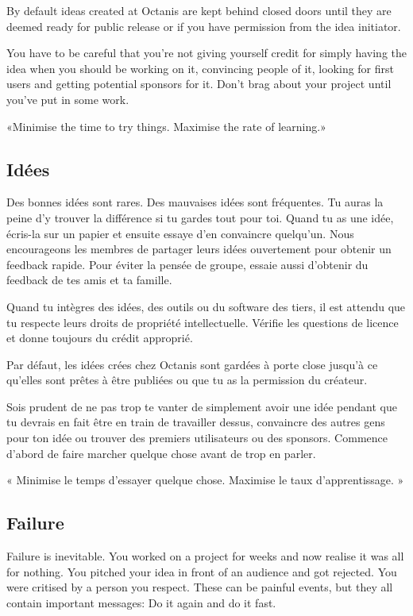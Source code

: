 	By default ideas created at Octanis are kept behind closed doors until they are deemed ready for public release or if you have permission from the idea initiator.

	You have to be careful that you're not giving yourself credit for simply having the idea when you should be working on it, convincing people of it, looking for first users and getting potential sponsors for it. Don't brag about your project until you've put in some work.

	«Minimise the time to try things. Maximise the rate of learning.»





\french
	\subsection{Idées}
	Des bonnes idées sont rares. Des mauvaises idées sont fréquentes. Tu auras la peine d'y trouver la différence si tu gardes tout pour toi. 
	Quand tu as une idée, écris-la sur un papier et ensuite essaye d'en convaincre quelqu'un. Nous encourageons les membres de partager leurs idées ouvertement pour obtenir un feedback rapide. Pour éviter la pensée de groupe, essaie aussi d'obtenir du feedback de tes amis et ta famille. 

	Quand tu intègres des idées, des outils ou du software des tiers, il est attendu que tu respecte leurs droits de propriété intellectuelle. Vérifie les questions de licence et donne toujours du crédit approprié.

	Par défaut, les idées crées chez Octanis sont gardées à porte close jusqu'à ce qu'elles sont prêtes à être publiées ou que tu as la permission du créateur. 

	Sois prudent de ne pas trop te vanter de simplement avoir une idée pendant que tu devrais en fait être en train de travailler dessus, convaincre des autres gens pour ton idée ou trouver des premiers utilisateurs ou des sponsors. Commence d'abord de faire marcher quelque chose avant de trop en parler. 

	« Minimise le temps d'essayer quelque chose. Maximise le taux d'apprentissage. »




\english
	\subsection{Failure}
	Failure is inevitable. You worked on a project for weeks and now realise it was all for nothing. You pitched your idea in front of an audience and got rejected. You were critised by a person you respect. 
	These can be painful events, but they all contain important messages: Do it again and do it fast.

